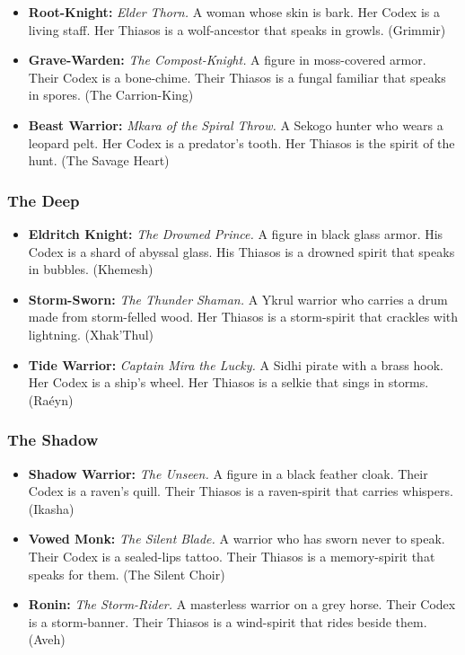 \begin{itemize}
\item \textbf{Root-Knight:} \textit{Elder Thorn.} A woman whose skin is bark. Her Codex is a living staff. Her Thiasos is a wolf-ancestor that speaks in growls. (Grimmir)
\item \textbf{Grave-Warden:} \textit{The Compost-Knight.} A figure in moss-covered armor. Their Codex is a bone-chime. Their Thiasos is a fungal familiar that speaks in spores. (The Carrion-King)
\item \textbf{Beast Warrior:} \textit{Mkara of the Spiral Throw.} A Sekogo hunter who wears a leopard pelt. Her Codex is a predator's tooth. Her Thiasos is the spirit of the hunt. (The Savage Heart)
\end{itemize}

\subsubsection{The Deep}

\begin{itemize}
\item \textbf{Eldritch Knight:} \textit{The Drowned Prince.} A figure in black glass armor. His Codex is a shard of abyssal glass. His Thiasos is a drowned spirit that speaks in bubbles. (Khemesh)
\item \textbf{Storm-Sworn:} \textit{The Thunder Shaman.} A Ykrul warrior who carries a drum made from storm-felled wood. Her Thiasos is a storm-spirit that crackles with lightning. (Xhak'Thul)
\item \textbf{Tide Warrior:} \textit{Captain Mira the Lucky.} A Sidhi pirate with a brass hook. Her Codex is a ship's wheel. Her Thiasos is a selkie that sings in storms. (Raéyn)
\end{itemize}

\subsubsection{The Shadow}

\begin{itemize}
\item \textbf{Shadow Warrior:} \textit{The Unseen.} A figure in a black feather cloak. Their Codex is a raven's quill. Their Thiasos is a raven-spirit that carries whispers. (Ikasha)
\item \textbf{Vowed Monk:} \textit{The Silent Blade.} A warrior who has sworn never to speak. Their Codex is a sealed-lips tattoo. Their Thiasos is a memory-spirit that speaks for them. (The Silent Choir)
\item \textbf{Ronin:} \textit{The Storm-Rider.} A masterless warrior on a grey horse. Their Codex is a storm-banner. Their Thiasos is a wind-spirit that rides beside them. (Aveh)
\end{itemize}

